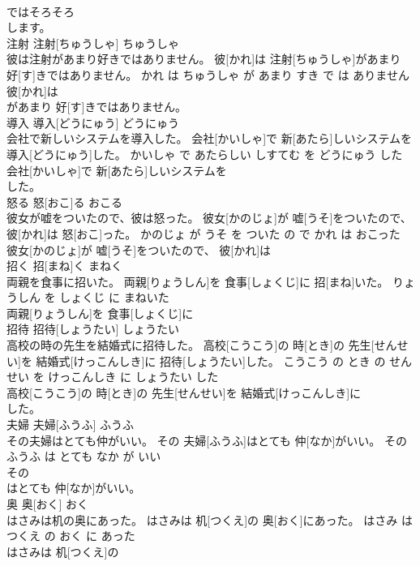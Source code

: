 \documentclass[8pt]{extreport}
\begin{document}
\begin{CJK}{UTF8}{min}
\\	ではそろそろ
\\	します。			
\\	注射	注射[ちゅうしゃ]	ちゅうしゃ	
\\	彼は注射があまり好きではありません。	彼[かれ]は 注射[ちゅうしゃ]があまり 好[す]きではありません。	かれ は ちゅうしゃ が あまり すき で は ありません	
\\	彼[かれ]は
\\	があまり 好[す]きではありません。			
\\	導入	導入[どうにゅう]	どうにゅう	
\\	会社で新しいシステムを導入した。	会社[かいしゃ]で 新[あたら]しいシステムを 導入[どうにゅう]した。	かいしゃ で あたらしい しすてむ を どうにゅう した	
\\	会社[かいしゃ]で 新[あたら]しいシステムを
\\	した。			
\\	怒る	怒[おこ]る	おこる	
\\	彼女が嘘をついたので、彼は怒った。	彼女[かのじょ]が 嘘[うそ]をついたので、 彼[かれ]は 怒[おこ]った。	かのじょ が うそ を ついた の で かれ は おこった	
\\	彼女[かのじょ]が 嘘[うそ]をついたので、 彼[かれ]は
\\	招く	招[まね]く	まねく	
\\	両親を食事に招いた。	両親[りょうしん]を 食事[しょくじ]に 招[まね]いた。	りょうしん を しょくじ に まねいた	
\\	両親[りょうしん]を 食事[しょくじ]に
\\	招待	招待[しょうたい]	しょうたい	
\\	高校の時の先生を結婚式に招待した。	高校[こうこう]の 時[とき]の 先生[せんせい]を 結婚式[けっこんしき]に 招待[しょうたい]した。	こうこう の とき の せんせい を けっこんしき に しょうたい した	
\\	高校[こうこう]の 時[とき]の 先生[せんせい]を 結婚式[けっこんしき]に
\\	した。			
\\	夫婦	夫婦[ふうふ]	ふうふ	
\\	その夫婦はとても仲がいい。	その 夫婦[ふうふ]はとても 仲[なか]がいい。	その ふうふ は とても なか が いい	
\\	その
\\	はとても 仲[なか]がいい。			
\\	奥	奥[おく]	おく	
\\	はさみは机の奥にあった。	はさみは 机[つくえ]の 奥[おく]にあった。	はさみ は つくえ の おく に あった	
\\	はさみは 机[つくえ]の

\end{CJK}
\end{document}
